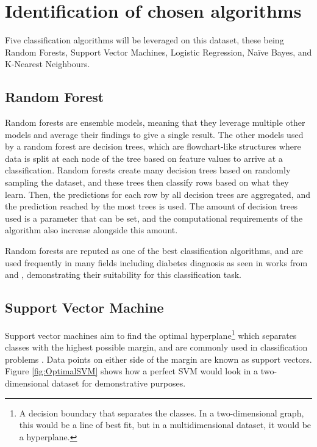 \documentclass[12pt]{report}
\newcommand{\para}{\vspace{8pt}\noindent}
\begin{document}
\section{Identification of chosen algorithms}\label{sec:ChosenAlgorithms}
Five classification algorithms will be leveraged on this dataset, these being Random Forests,
Support Vector Machines, Logistic Regression, Na\"ive Bayes, and K-Nearest Neighbours.

\subsection{Random Forest}
Random forests are ensemble models, meaning that they leverage multiple other models and average their findings to 
give a single result. The other models used by a random forest are decision trees, which are flowchart-like structures where 
data is split at each node of the tree based on feature values to arrive at a classification. Random forests create many decision 
trees based on randomly sampling the dataset, and these trees then classify rows based on what they learn. Then, the predictions 
for each row by all decision trees are aggregated, and the prediction reached by the most trees is used.
The amount of decision trees used is a parameter that can be set, and the computational requirements of the algorithm 
also increase alongside this amount.

\para Random forests are reputed as one of the best classification algorithms, and are used frequently in many fields 
including diabetes diagnosis as seen in works from \textcite{chang_pima_2023} and \textcite{alzubi_diabetes_2023},
demonstrating their suitability for this classification task.

\subsection{Support Vector Machine}
Support vector machines aim to find the optimal hyperplane\footnote{A decision boundary that separates the classes. In a two-dimensional graph, this would be a line of best fit, but in a multidimensional dataset, it would be a hyperplane.}
which separates classes with the highest possible margin, and are commonly used in classification problems \autocite{ibm_what_2023}. Data points on either 
side of the margin are known as support vectors. Figure \ref{fig:OptimalSVM} shows how a perfect SVM would look in a two-dimensional dataset for demonstrative purposes.
\end{document}
